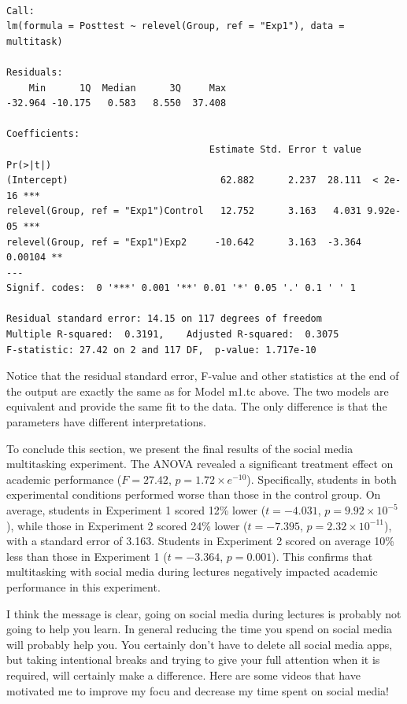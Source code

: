 \documentclass[
  letterpaper,
]{book}
\begin{document}
\begin{verbatim}

Call:
lm(formula = Posttest ~ relevel(Group, ref = "Exp1"), data = multitask)

Residuals:
    Min      1Q  Median      3Q     Max 
-32.964 -10.175   0.583   8.550  37.408 

Coefficients:
                                    Estimate Std. Error t value Pr(>|t|)    
(Intercept)                           62.882      2.237  28.111  < 2e-16 ***
relevel(Group, ref = "Exp1")Control   12.752      3.163   4.031 9.92e-05 ***
relevel(Group, ref = "Exp1")Exp2     -10.642      3.163  -3.364  0.00104 ** 
---
Signif. codes:  0 '***' 0.001 '**' 0.01 '*' 0.05 '.' 0.1 ' ' 1

Residual standard error: 14.15 on 117 degrees of freedom
Multiple R-squared:  0.3191,    Adjusted R-squared:  0.3075 
F-statistic: 27.42 on 2 and 117 DF,  p-value: 1.717e-10
\end{verbatim}

Notice that the residual standard error, F-value and other statistics at
the end of the output are exactly the same as for Model m1.tc above. The
two models are equivalent and provide the same fit to the data. The only
difference is that the parameters have different interpretations.

To conclude this section, we present the final results of the social
media multitasking experiment. The ANOVA revealed a significant
treatment effect on academic performance (\(F = 27.42\),
\(p = 1.72\times e^{-10}\)). Specifically, students in both experimental
conditions performed worse than those in the control group. On average,
students in Experiment 1 scored 12\% lower (\(t = -4.031\),
\(p = 9.92 \times 10^{-5}\)), while those in Experiment 2 scored 24\%
lower (\(t = -7.395\), \(p = 2.32 \times 10^{-11}\)), with a standard
error of 3.163. Students in Experiment 2 scored on average 10\% less
than those in Experiment 1 (\(t=-3.364\), \(p = 0.001\)). This confirms
that multitasking with social media during lectures negatively impacted
academic performance in this experiment.

I think the message is clear, going on social media during lectures is
probably not going to help you learn. In general reducing the time you
spend on social media will probably help you. You certainly don't have
to delete all social media apps, but taking intentional breaks and
trying to give your full attention when it is required, will certainly
make a difference. Here are some videos that have motivated me to
improve my focu and decrease my time spent on social media!
\end{document}
